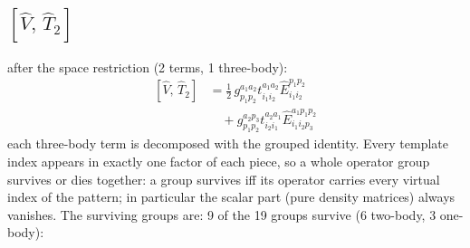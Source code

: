 \documentclass[11pt]{article}
\begin{document}
\subsection*{$\left[\hat{V},\, \hat{T}_{2}\right]$}
after the space restriction (2 terms, 1 three-body):
\begin{align}
\left[\hat{V},\, \hat{T}_{2}\right] &= \tfrac{1}{2}\, g^{a_{1}a_{2}}_{p_{1}p_{2}} t^{a_{1}a_{2}}_{i_{1}i_{2}} \hat{E}^{p_{1}p_{2}}_{i_{1}i_{2}} \\
&\quad + g^{a_{2}p_{3}}_{p_{1}p_{2}} t^{a_{2}a_{1}}_{i_{2}i_{1}} \hat{E}^{a_{1}p_{1}p_{2}}_{i_{1}i_{2}p_{3}}
\end{align}
each three-body term is decomposed with the grouped identity. Every template index appears in exactly one factor of each piece, so a whole operator group survives or dies together: a group survives iff its operator carries every virtual index of the pattern; in particular the scalar part (pure density matrices) always vanishes.  The surviving groups are:
9 of the 19 groups survive (6 two-body, 3 one-body):
\end{document}
